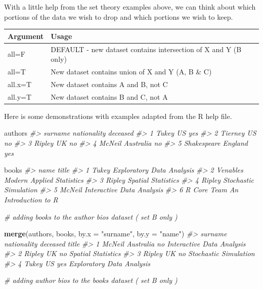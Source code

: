\documentclass[]{book}
\newenvironment{Shaded}{\begin{snugshade}}{\end{snugshade}}
\newcommand{\CommentTok}[1]{\textcolor[rgb]{0.56,0.35,0.01}{\textit{#1}}}
\newcommand{\DataTypeTok}[1]{\textcolor[rgb]{0.13,0.29,0.53}{#1}}
\newcommand{\KeywordTok}[1]{\textcolor[rgb]{0.13,0.29,0.53}{\textbf{#1}}}
\newcommand{\NormalTok}[1]{#1}
\newcommand{\StringTok}[1]{\textcolor[rgb]{0.31,0.60,0.02}{#1}}
\theoremstyle{definition}
\theoremstyle{definition}
\theoremstyle{definition}
\theoremstyle{remark}
\begin{document}
With a little help from the set theory examples above, we can think
about which portions of the data we wish to drop and which portions we
wish to keep.

\begin{longtable}[]{@{}ll@{}}
\toprule
Argument & Usage\tabularnewline
\midrule
\endhead
all=F & DEFAULT - new dataset contains intersection of X and Y (B
only)\tabularnewline
all=T & New dataset contains union of X and Y (A, B \& C)\tabularnewline
all.x=T & New dataset contains A and B, not C\tabularnewline
all.y=T & New dataset contains B and C, not A\tabularnewline
\bottomrule
\end{longtable}

Here is some demonstrations with examples adapted from the R help file.

\begin{Shaded}
\begin{Highlighting}[]

\NormalTok{authors   }
\CommentTok{#>       surname nationality deceased}
\CommentTok{#> 1       Tukey          US      yes}
\CommentTok{#> 2     Tierney          US       no}
\CommentTok{#> 3      Ripley          UK       no}
\CommentTok{#> 4      McNeil   Australia       no}
\CommentTok{#> 5 Shakespeare     England      yes}

\NormalTok{books    }
\CommentTok{#>          name                     title}
\CommentTok{#> 1       Tukey Exploratory Data Analysis}
\CommentTok{#> 2    Venables Modern Applied Statistics}
\CommentTok{#> 3      Ripley        Spatial Statistics}
\CommentTok{#> 4      Ripley     Stochastic Simulation}
\CommentTok{#> 5      McNeil Interactive Data Analysis}
\CommentTok{#> 6 R Core Team      An Introduction to R}



\CommentTok{# adding books to the author bios dataset  ( set B only )}

\KeywordTok{merge}\NormalTok{(authors, books, }\DataTypeTok{by.x =} \StringTok{"surname"}\NormalTok{, }\DataTypeTok{by.y =} \StringTok{"name"}\NormalTok{)    }
\CommentTok{#>   surname nationality deceased                     title}
\CommentTok{#> 1  McNeil   Australia       no Interactive Data Analysis}
\CommentTok{#> 2  Ripley          UK       no        Spatial Statistics}
\CommentTok{#> 3  Ripley          UK       no     Stochastic Simulation}
\CommentTok{#> 4   Tukey          US      yes Exploratory Data Analysis}



\CommentTok{# adding author bios to the books dataset  ( set B only )}


\end{Highlighting}
\end{Shaded}
\end{document}
